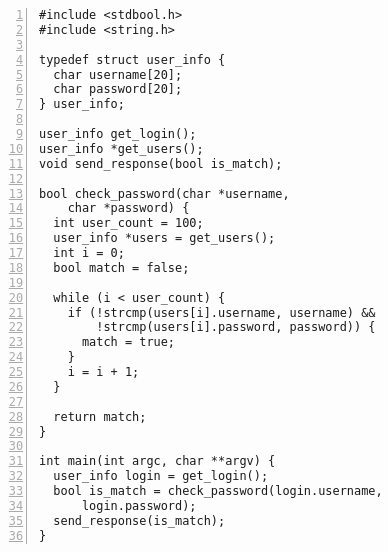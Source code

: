 \begin{lstlisting}[float, style=dlmc, numbers=left, caption={Password checker example}, label=example:code:check_password]
#include <stdbool.h>
#include <string.h>

typedef struct user_info {
  char username[20];
  char password[20];
} user_info;

user_info get_login();
user_info *get_users();
void send_response(bool is_match);

bool check_password(char *username,
    char *password) {
  int user_count = 100;
  user_info *users = get_users();
  int i = 0;
  bool match = false;

  while (i < user_count) {
    if (!strcmp(users[i].username, username) &&
        !strcmp(users[i].password, password)) {
      match = true;
    }
    i = i + 1;
  }

  return match;
}

int main(int argc, char **argv) {
  user_info login = get_login();
  bool is_match = check_password(login.username,
      login.password);
  send_response(is_match);
}
\end{lstlisting}
